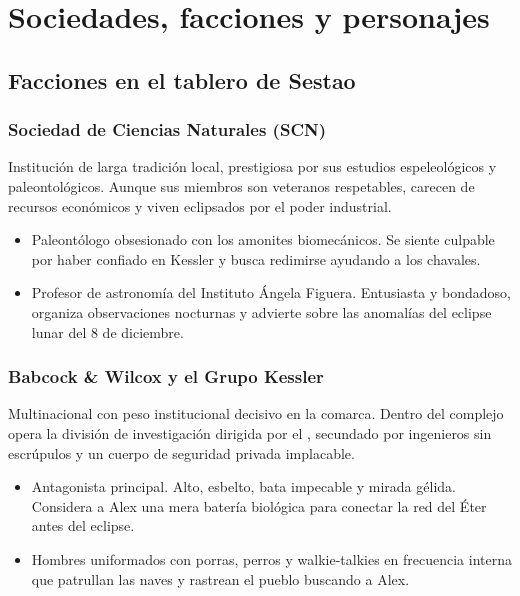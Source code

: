 \chapter{Sociedades, facciones y personajes}

\section{Facciones en el tablero de Sestao}

\subsection{Sociedad de Ciencias Naturales (SCN)}
Institución de larga tradición local, prestigiosa por sus estudios espeleológicos y paleontológicos. Aunque sus miembros son veteranos respetables, carecen de recursos económicos y viven eclipsados por el poder industrial. 
\begin{itemize}
  \item {} Paleontólogo obsesionado con los amonites biomecánicos. Se siente culpable por haber confiado en Kessler y busca redimirse ayudando a los chavales.
  \item {} Profesor de astronomía del Instituto Ángela Figuera. Entusiasta y bondadoso, organiza observaciones nocturnas y advierte sobre las anomalías del eclipse lunar del 8 de diciembre.
\end{itemize}


\subsection{Babcock \& Wilcox y el Grupo Kessler}
Multinacional con peso institucional decisivo en la comarca. Dentro del complejo opera la división de investigación dirigida por el , secundado por ingenieros sin escrúpulos y un cuerpo de seguridad privada implacable. 
\begin{itemize}
  \item {} Antagonista principal. Alto, esbelto, bata impecable y mirada gélida. Considera a Alex una mera batería biológica para conectar la red del Éter antes del eclipse.
  \item {} Hombres uniformados con porras, perros y walkie-talkies en frecuencia interna que patrullan las naves y rastrean el pueblo buscando a Alex.
\end{itemize}

